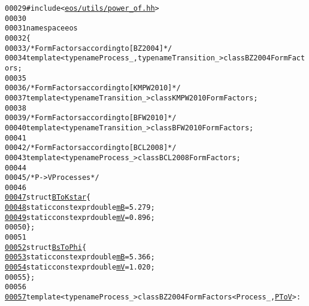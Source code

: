 \begin{footnotesize}
\begin{alltt}
00029 \textcolor{preprocessor}{#include <\hyperlink{power__of_8hh}{eos/utils/power_of.hh}>}
00030 
00031 \textcolor{keyword}{namespace }eos
00032 \{
00033     \textcolor{comment}{/* Form Factors according to [BZ2004] */}
00034     \textcolor{keyword}{template} <\textcolor{keyword}{typename} Process\_, \textcolor{keyword}{typename} Transition\_> \textcolor{keyword}{class }BZ2004FormFactors;
00035 
00036     \textcolor{comment}{/* Form Factors according to [KMPW2010] */}
00037     \textcolor{keyword}{template} <\textcolor{keyword}{typename} Transition\_> \textcolor{keyword}{class }KMPW2010FormFactors;
00038 
00039     \textcolor{comment}{/* Form Factors according to [BFW2010] */}
00040     \textcolor{keyword}{template} <\textcolor{keyword}{typename} Transition\_> \textcolor{keyword}{class }BFW2010FormFactors;
00041 
00042     \textcolor{comment}{/* Form Factors according to [BCL2008] */}
00043     \textcolor{keyword}{template} <\textcolor{keyword}{typename} Process\_> \textcolor{keyword}{class }BCL2008FormFactors;
00044 
00045     \textcolor{comment}{/* P -> V Processes */}
00046 
\hypertarget{mesonic-impl_8hh_source_l00047}{}\hyperlink{structeos_1_1BToKstar}{00047}     \textcolor{keyword}{struct }\hyperlink{structeos_1_1BToKstar}{BToKstar} \{
\hypertarget{mesonic-impl_8hh_source_l00048}{}\hyperlink{structeos_1_1BToKstar_aaf3ba74345ac88ef83df9e07fb187d7c}{00048}         \textcolor{keyword}{static} constexpr \textcolor{keywordtype}{double} \hyperlink{structeos_1_1BToKstar_aaf3ba74345ac88ef83df9e07fb187d7c}{mB} = 5.279;
\hypertarget{mesonic-impl_8hh_source_l00049}{}\hyperlink{structeos_1_1BToKstar_aaa86a61d90e34af72cb8563491911af3}{00049}         \textcolor{keyword}{static} constexpr \textcolor{keywordtype}{double} \hyperlink{structeos_1_1BToKstar_aaa86a61d90e34af72cb8563491911af3}{mV} = 0.896;
00050     \};
00051 
\hypertarget{mesonic-impl_8hh_source_l00052}{}\hyperlink{structeos_1_1BsToPhi}{00052}     \textcolor{keyword}{struct }\hyperlink{structeos_1_1BsToPhi}{BsToPhi} \{
\hypertarget{mesonic-impl_8hh_source_l00053}{}\hyperlink{structeos_1_1BsToPhi_a7b5cc22510f449a636fe09bf25280c15}{00053}         \textcolor{keyword}{static} constexpr \textcolor{keywordtype}{double} \hyperlink{structeos_1_1BsToPhi_a7b5cc22510f449a636fe09bf25280c15}{mB} = 5.366;
\hypertarget{mesonic-impl_8hh_source_l00054}{}\hyperlink{structeos_1_1BsToPhi_a7195e15e3af1c5f2e4c1f34a5ed02a28}{00054}         \textcolor{keyword}{static} constexpr \textcolor{keywordtype}{double} \hyperlink{structeos_1_1BsToPhi_a7195e15e3af1c5f2e4c1f34a5ed02a28}{mV} = 1.020;
00055     \};
00056 
\hypertarget{mesonic-impl_8hh_source_l00057}{}\hyperlink{classeos_1_1BZ2004FormFactors_3_01Process___00_01PToV_01_4}{00057}     \textcolor{keyword}{template} <\textcolor{keyword}{typename} Process\_> \textcolor{keyword}{class }BZ2004FormFactors<Process\_, \hyperlink{structeos_1_1PToV}{PToV}> :

\end{alltt}
\end{footnotesize}
